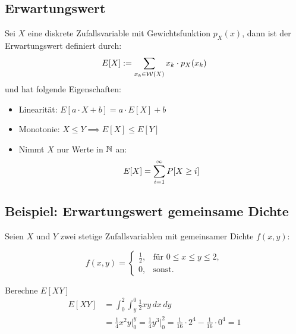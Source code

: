 \subsection{Erwartungswert}
Sei $X$ eine diskrete Zufallsvariable mit Gewichtsfunktion $p_X (x)$, dann ist
der Erwartungswert definiert durch:
\begin{align*}
  E[X] := \sum_{x_k \in \mathcal{W} (X)} x_k \cdot p_X (x_k)
\end{align*}
und hat folgende Eigenschaften:
\begin{itemize}
  \item Linearität: $E[a \cdot X + b] = a \cdot E[X] + b$
  \item Monotonie: $X \leq Y \implies E[X] \leq E[Y]$
  \item Nimmt $X$ nur Werte in $\mathbb{N} $ an:
        \begin{align*}
          E[X] = \sum_{i = 1}^\infty P[X \geq i]
        \end{align*}
\end{itemize}

\BoxStart{}
\subsection{Beispiel: Erwartungswert gemeinsame Dichte}
Seien \(X\) und \(Y\) zwei stetige Zufallsvariablen mit gemeinsamer Dichte \(f(x, y)\):

\[ f(x, y) = \begin{cases}
    \frac{1}{2}, & \text{für } 0 \leq x \leq y \leq 2, \\
    0,           & \text{sonst}.
  \end{cases} \]

Berechne \(E[XY]\)\\[-20pt]

\begin{align*}
  E[XY] & = \int_{0}^{2} \int_{y}^{0} \frac{1}{2}xy \, dx \, dy                                                                 \\
        & = \frac{1}{4} x^2y \Big|_{0}^{y} = \frac{1}{4}y^3 \Big|_{0}^{2} = \frac{1}{16} \cdot 2^4 - \frac{1}{16} \cdot 0^4 = 1
\end{align*}


\BoxEnd{}

